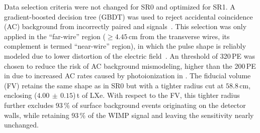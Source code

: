 \documentclass[
    reprint,
    superscriptaddress,
    aps, prl,
    amsmath,amssymb,
    twocolumn,
    showkeys,
    floatfix,
    nofootinbib,
]{revtex4-2}
\begin{document}
Data selection criteria were not changed for SR0 and optimized for SR1.
A gradient-boosted decision tree (GBDT) was used to reject accidental coincidence (AC) background from incorrectly paired \sone and \stwo signals~\cite{XENON:2024ap2}.
This selection was only applied in the ``far-wire'' region ($\geq4.45\,\mathrm{cm}$ from the transverse wires, its complement is termed ``near-wire'' region), in which the \stwo pulse shape is reliably modeled due to lower distortion of the electric field~\cite{XENON:2024ap1}.
An \stwo threshold of 320\,PE was chosen to reduce the risk of AC background mismodeling, higher than the 200\,PE in \srzero due to increased AC rates caused by photoionization in \srone.
The fiducial volume (FV) retains the same shape as in SR0 but with a tighter radius cut at $58.8\,\mathrm{cm}$, enclosing ($4.00\,\pm\,0.15$)\,t of LXe.
With respect to the \srzero FV, this tighter radius further excludes 93\,\% of surface background events originating on the detector walls, while retaining 93\,\% of the WIMP signal and leaving the sensitivity nearly unchanged.%
\end{document}
